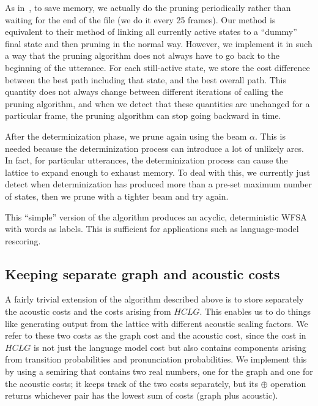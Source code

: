 \documentclass{article}
\def\HCLG{{\mathit{HCLG}}}
\begin{document}
As in~\cite{efficient_general}, to save memory, we actually do the pruning
periodically rather than waiting for the end of the file (we do it every 25 frames).
Our method is equivalent to their method of linking all currently active states to a ``dummy''
final state and then pruning in the normal way.  However, we implement it in such a way
that the pruning algorithm does not always have to go back to the beginning of the utterance.
For each still-active state, we store the cost difference between the best path including that
state, and the best overall path.  This quantity does not always change between different
iterations of calling the pruning algorithm, and when we detect that these quantities are 
unchanged for a particular frame, the pruning algorithm can stop going backward in time.

After the determinization phase, we prune again using the beam $\alpha$.  This is needed because
the determinization process can introduce a lot of unlikely arcs.  In fact, for particular
utterances, the determinization process can cause the lattice to expand enough to
exhaust memory.  To deal with this, we currently just detect when determinization
has produced more than a pre-set maximum number of states, then we prune with a tighter
beam and try again.

This ``simple'' version of the algorithm produces an acyclic, deterministic
WFSA with words as labels.  This is sufficient for applications such as language-model
rescoring.

\vspace*{-0.075in}
\subsection{Keeping separate graph and acoustic costs}
\vspace*{-0.05in}

A fairly trivial extension of the algorithm described above is to store separately
the acoustic costs and the costs arising from $\HCLG$.  This enables us to do things
like generating output from the lattice with different acoustic scaling factors.
We refer to these two costs as the graph cost and the acoustic cost, since the cost
in $\HCLG$ is not just the language model cost but also contains components
arising from transition probabilities and pronunciation probabilities.  We implement
this by using a semiring that contains two real numbers, one for the graph and one
for the acoustic costs; it keeps track of the two costs separately, but its
$\oplus$ operation returns whichever pair has the lowest sum of costs (graph plus acoustic).
\end{document}
